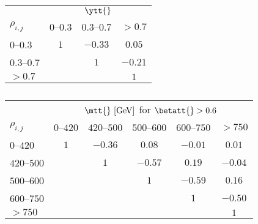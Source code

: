 \begin{table}[!htp]\centering
\caption{ }
\begin{tabular}{l c c c }
  \toprule
  &\multicolumn{3}{c}{$\ytt{}$}    \\
  $\rho_{i,j}$      &  $0$--$0.3$   &  $0.3$--$0.7$  &  $>0.7$  \\
  \midrule
  $0$--$0.3$    &   $1$   &   $-0.33$  &   $0.05$   \\
  $0.3$--$0.7$  &         &   $1$      &   $-0.21$  \\
  $>0.7$        &         &            &   $1$      \\
  \bottomrule
\end{tabular}
\label{tab:corr_ytt}
\end{table}

\begin{table}[!htp]\centering
\caption{ }
\begin{tabular}{l c c c c c }
  \toprule
  &\multicolumn{5}{c}{$\mtt{}~[\rm{GeV}]$ for $\betatt{}> 0.6$}    \\
  $\rho_{i,j}$ & $0$--$420$ & $420$--$500$ & $500$--$600$ & $600$--$750$ & $>750$ \\
  \midrule
  $0$--$420$      & $1$ & $-0.36$ & $0.08$  & $-0.01$ & $0.01$  \\
  $420$--$500$    &     & $1$     & $-0.57$ & $0.19$  & $-0.04$ \\
  $500$--$600$    &     &         & $1$     & $-0.59$ & $0.16$  \\
  $600$--$750$    &     &         &         & $1$     & $-0.50$ \\
  $>750$          &     &         &         &         & $1$     \\
  \bottomrule
\end{tabular}
\label{tab:corr_mtt_beta}
\end{table}
